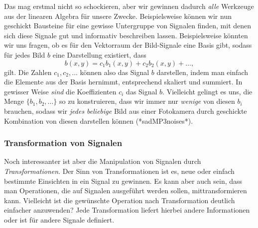 Das mag erstmal nicht so schockieren, aber wir gewinnen dadurch \emph{alle} Werkzeuge aus der linearen Algebra f\"ur unsere Zwecke.
Beispielsweise k\"onnen wir nun geschickt Bausteine f\"ur eine gewisse Untergruppe von Signalen finden, mit denen sich diese Signale gut und informativ beschreiben lassen.
Beispielsweise k\"onnten wir uns fragen, ob es f\"ur den Vektorraum der Bild-Signale eine Basis gibt, sodass f\"ur jedes Bild $b$ eine Darstellung existiert, dass
\[
b(x,y) = c_1 b_1(x,y) + c_2 b_2(x,y) + \dots,
\]
gilt. 
Die Zahlen $c_1, c_2, \dots$ k\"onnen also das Signal $b$ darstellen, indem man einfach die Elemente aus der Basis hernimmt, entsprechend skaliert und summiert.
In gewisser Weise \emph{sind} die Koeffizienten $c_i$ das Signal $b$.
Vielleicht gelingt es uns, die Menge $\{b_1, b_2, \dots\}$ so zu konstruieren, dass wir immer nur \emph{wenige} von diesen $b_i$ brauchen, sodass wir \emph{jedes beliebige} Bild aus einer Fotokamera durch geschickte Kombination von diesen darstellen k\"onnen (*sadMP3noises*). 
%
\subsubsection{Transformation von Signalen}
%
Noch interessanter ist aber die Manipulation von Signalen durch \emph{Transformationen}.
Der Sinn von Transformationen ist es, neue oder einfach bestimmte Einsichten in ein Signal zu gewinnen.
Es kann aber auch sein, dass man Operationen, die auf Signalen ausgef\"uhrt werden sollen,  mittransformieren kann.
Vielleicht ist die gew\"unschte Operation nach Transformation deutlich einfacher anzuwenden?
Jede Transformation liefert hierbei andere Informationen oder ist f\"ur andere Signale definiert.

